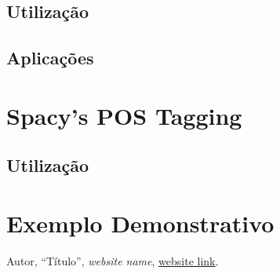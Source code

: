 \documentclass[12pt]{article}
\begin{document}
\subsection{Utilização}




\subsection{Aplicações}





\section{Spacy's POS Tagging}



\subsection{Utilização}


\section{Exemplo Demonstrativo}







\setcounter{section}{0}
\setcounter{subsection}{0}


\newpage

\appendixpage
\renewcommand{\thesubsection}{\Alph{subsection}}



\newpage

\begin{thebibliography}{99}
	
	
	Autor,
	``Título'',
	\textit{website name},
	\url{website link}.
	
\end{thebibliography}
\end{document}
